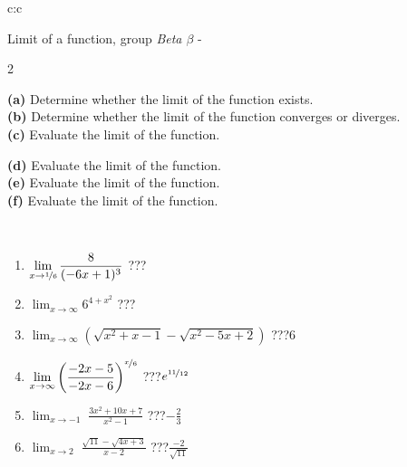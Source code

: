\documentclass[10pt]{report}
\begin{document}
\newpage
\thispagestyle{empty}
\begin{tabular}{c:c}
\begin{minipage}[c][104.5mm][t]{0.5\linewidth}
\begin{center}
\vspace{5mm}
{\huge Limit of a function, group \textit{Beta $\beta$} -}\\[5mm]
\begin{minipage}{0.95\linewidth}
\begin{center}
{\small \begin{multicols}{2} \raggedright
\textbf{(a)} Determine whether the limit of the function exists. \\[1mm]
\textbf{(b)} Determine whether the limit of the function converges or diverges. \\[1mm]
\textbf{(c)} Evaluate the limit of the function. \par \columnbreak
\textbf{(d)} Evaluate the limit of the function. \\[1mm]
\textbf{(e)} Evaluate the limit of the function. \\[1mm]
\textbf{(f)} Evaluate the limit of the function. \\[1mm]
\end{multicols}
}
\end{center}
\end{minipage}
\\[1mm]
\begin{minipage}{0.79\linewidth}
\begin{center}
\begin{varwidth}{\linewidth}
\setlength{\itemsep}{0pt}
\begin{enumerate}
\normalsize
\item $\displaystyle\lim_{x\to\nicefrac{1}{6}}{\frac{8}{(-6x+1)^{3}}}$\quad \dotfill\; ???\;\dotfill \quad {}
\item $\displaystyle\lim_{x\to\infty}{6^{4+x^2}}$\quad \dotfill\; ???\;\dotfill \quad {}
\item $\displaystyle\lim_{x\to\infty}{\left(\sqrt{x^2+x-1} - \sqrt{x^2-5x+2}\right)}$\quad \dotfill\; ???\;\dotfill \quad $6$
\item $\displaystyle\lim_{x\to\infty}{\left( \frac{-2x-5}{-2x-6} \right)^{\nicefrac{x}{6}}}$\quad \dotfill\; ???\;\dotfill \quad $e^{\nicefrac{11}{12}}$
\item $\displaystyle\lim_{x\to -1}{\;\frac{3x^2+10x+7}{x^2-1}}$\quad \dotfill\; ???\;\dotfill \quad $-\frac{2}{3}$
\item $\displaystyle\lim_{x\to 2}{\;\frac{\sqrt{11}-\sqrt{4x+3}}{x-2}}$\quad \dotfill\; ???\;\dotfill \quad $\frac{-2}{\sqrt{11}}$

\end{enumerate}
\end{varwidth}
\end{center}
\end{minipage}
\end{center}
\end{minipage}
\end{tabular}
\end{document}
